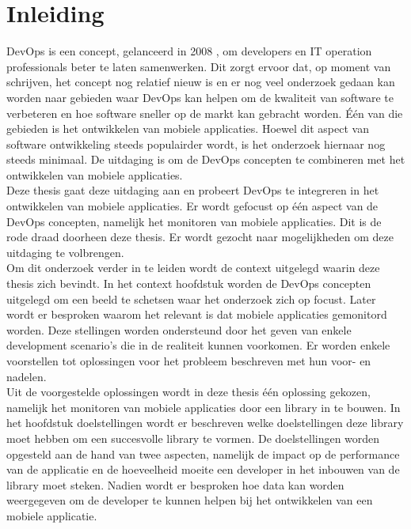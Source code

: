 \chapter{Inleiding}
\label{inleiding}


DevOps is een concept, gelanceerd in 2008 \cite{DevOpsWiki}, om developers en IT operation professionals beter te laten samenwerken. Dit zorgt ervoor dat, op moment van schrijven, het concept nog relatief nieuw is en er nog veel onderzoek gedaan kan worden naar gebieden waar DevOps kan helpen om de kwaliteit van software te verbeteren en hoe software sneller op de markt kan gebracht worden. \'E\'en van die gebieden is het ontwikkelen van mobiele applicaties. Hoewel dit aspect van software ontwikkeling steeds populairder wordt, is het onderzoek hiernaar nog steeds minimaal. De uitdaging is om de DevOps concepten te combineren met het ontwikkelen van mobiele applicaties. \\

Deze thesis gaat deze uitdaging aan en probeert DevOps te integreren in het ontwikkelen van mobiele applicaties. Er wordt gefocust op \'e\'en aspect van de DevOps concepten, namelijk het monitoren van mobiele applicaties. Dit is de rode draad doorheen deze thesis. Er wordt gezocht naar mogelijkheden om deze uitdaging te volbrengen. \\

Om dit onderzoek verder in te leiden wordt de context uitgelegd waarin deze thesis zich bevindt. In het context hoofdstuk worden de DevOps concepten uitgelegd om een beeld te schetsen waar het onderzoek zich op focust. Later wordt er besproken waarom het relevant is dat mobiele applicaties gemonitord worden. Deze stellingen worden ondersteund door het geven van enkele development scenario's die in de realiteit kunnen voorkomen. Er worden enkele voorstellen tot oplossingen voor het probleem beschreven met hun voor- en nadelen.\\

Uit de voorgestelde oplossingen wordt in deze thesis \'e\'en oplossing gekozen, namelijk het monitoren van mobiele applicaties door een library in te bouwen. In het hoofdstuk doelstellingen wordt er beschreven welke doelstellingen deze library moet hebben om een succesvolle library te vormen. De doelstellingen worden opgesteld aan de hand van twee aspecten, namelijk de impact op de performance van de applicatie en de hoeveelheid moeite een developer in het inbouwen van de library moet steken. Nadien wordt er besproken hoe data kan worden weergegeven om de developer te kunnen helpen bij het ontwikkelen van een mobiele applicatie.\\

